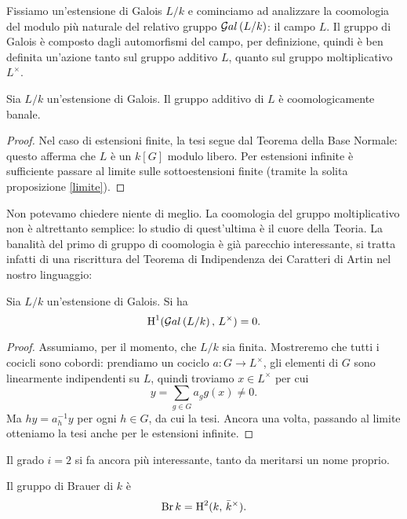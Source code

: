 Fissiamo un'estensione di Galois $ L/k $ e cominciamo ad analizzare la coomologia del modulo più naturale del relativo gruppo $ \mathcal{G}al\left( L/k \right) $: il campo $ L $. Il gruppo di Galois è composto dagli automorfismi del campo, per definizione, quindi è ben definita un'azione tanto sul gruppo additivo $ L $, quanto sul gruppo moltiplicativo $ L^\times $.

\begin{theorem} \label{Hadd}
	Sia $ L / k $ un'estensione di Galois. Il gruppo additivo di $ L $ è coomologicamente banale.
\end{theorem}
\begin{proof}
	Nel caso di estensioni finite, la tesi segue dal Teorema della Base Normale: questo afferma che $ L $ è un $ k[G] $ modulo libero. Per estensioni infinite è sufficiente passare al limite sulle sottoestensioni finite (tramite la solita proposizione \ref{limite}).
\end{proof}

Non potevamo chiedere niente di meglio. La coomologia del gruppo moltiplicativo non è altrettanto semplice: lo studio di quest'ultima è il cuore della Teoria. La banalità del primo di gruppo di coomologia è già parecchio interessante, si tratta infatti di una riscrittura del Teorema di Indipendenza dei Caratteri di Artin nel nostro linguaggio:

\begin{theorem}[Hilbert 90]\label{H90}
	Sia $ L/k $ un'estensione di Galois. Si ha
	\[ \operatorname{H}^1(\mathcal{G}al\left(  L / k \right), \, L^\times) = 0. \]
\end{theorem}
\begin{proof}
	Assumiamo, per il momento, che $ L/k $ sia finita. Mostreremo che tutti i cocicli sono cobordi: prendiamo un cociclo $ a \colon G \to L^\times $, gli elementi di $ G $ sono linearmente indipendenti su $ L $, quindi troviamo $ x \in L^\times $ per cui
	\[ y = \sum_{g \in G} a_g g(x) \neq 0. \]
	Ma $ hy = a_h^{-1}y $ per ogni $ h \in G $, da cui la tesi.
	Ancora una volta, passando al limite otteniamo la tesi anche per le estensioni infinite. \todo[bruttino]
\end{proof}

Il grado $ i = 2 $ si fa ancora più interessante, tanto da meritarsi un nome proprio.
\begin{definition}
	Il gruppo di Brauer di $ k $ è $$  \operatorname{Br} k = \operatorname{H}^2(k, \, \bar{k}^\times).  $$
\end{definition}

